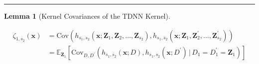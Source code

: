 \documentclass[letterpaper,10pt]{article}
\numberwithin{equation}{section}
\numberwithin{thm}{section}
\newtheorem{lem}{Lemma}
\numberwithin{lem}{section}
\numberwithin{cor}{section}
\newcommand{\E}{\mathbb{E}}
\newcommand{\1}{\mathbbm{1}}
\newcommand{\Cov}{\text{Cov}}
\begin{document}
\hrule

\begin{lem}[Kernel Covariances of the TDNN Kernel]\label{Cov_TDNN}

\end{lem}

\begin{equation}
	\begin{aligned}
		\zeta_{1,s_2}\left(\mathbf{x}\right)
		 & = \Cov\left(
		h_{s_1, s_2}\left(\mathbf{x}; \mathbf{Z}_1, \mathbf{Z}_2, \ldots, \mathbf{Z}_{s_2}\right),
		h_{s_1, s_2}\left(\mathbf{x}; \mathbf{Z}_1, \mathbf{Z}_{2}^{\prime}, \ldots, \mathbf{Z}_{s_2}^{\prime}\right)
		\right)                      \\
		 & = \E_{\mathbf{Z}_1}\left[
			\Cov_{D, D^\prime}\left(
			h_{s_1, s_2}\left(\mathbf{x}; D\right),
			h_{s_1, s_2}\left(\mathbf{x}; D^{\prime}\right)
			\, | \, D_1 = D_{1}^{\prime} = \mathbf{Z}_1
			\right)
			\right]

\end{aligned}
\end{equation}
\end{document}
